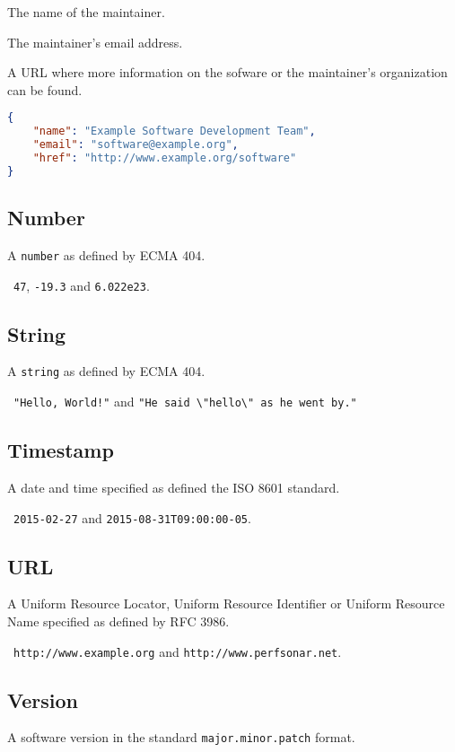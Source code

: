 \documentclass[10pt]{article}
\begin{document}
 The name of the maintainer.

 The maintainer's email address.

 A URL where more information on the sofware or
the maintainer's organization can be found.

\example
\begin{lstlisting}[language=json]
{
    "name": "Example Software Development Team",
    "email": "software@example.org",
    "href": "http://www.example.org/software"
}
\end{lstlisting}


\subsection{Number}
A {\tt number} as defined by ECMA 404.

\example\ {\tt 47}, {\tt -19.3} and {\tt 6.022e23}.


\subsection{String}
A {\tt string} as defined by ECMA 404.

\example\ {\tt "Hello, World!"} and {\tt "He said
  \textbackslash"hello\textbackslash" as he went by."}


\subsection{Timestamp}
A date and time specified as defined the ISO 8601 standard.

\example\ {\tt 2015-02-27} and {\tt 2015-08-31T09:00:00-05}.


\subsection{URL}
A Uniform Resource Locator, Uniform Resource Identifier or Uniform
Resource Name specified as defined by RFC 3986.

\example\ {\tt http://www.example.org} and {\tt http://www.perfsonar.net}.



\subsection{Version}
A software version in the standard {\tt major.minor.patch} format.
\end{document}
